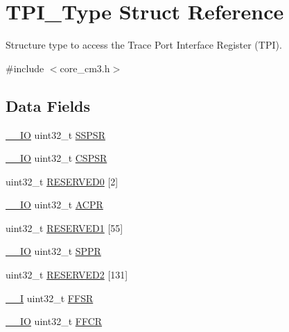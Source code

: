 \hypertarget{structTPI__Type}{\section{T\-P\-I\-\_\-\-Type Struct Reference}
\label{structTPI__Type}
}


Structure type to access the Trace Port Interface Register (T\-P\-I).  




{\ttfamily \#include $<$core\-\_\-cm3.\-h$>$}

\subsection*{Data Fields}
\begin{DoxyCompactItemize}
\item 
\hyperlink{core__cm3_8h_aec43007d9998a0a0e01faede4133d6be}{\-\_\-\-\_\-\-I\-O} uint32\-\_\-t \hyperlink{structTPI__Type_a158e9d784f6ee6398f4bdcb2e4ca0912}{S\-S\-P\-S\-R}
\item 
\hyperlink{core__cm3_8h_aec43007d9998a0a0e01faede4133d6be}{\-\_\-\-\_\-\-I\-O} uint32\-\_\-t \hyperlink{structTPI__Type_aa723ef3d38237aa2465779b3cc73a94a}{C\-S\-P\-S\-R}
\item 
uint32\-\_\-t \hyperlink{structTPI__Type_af143c5e8fc9a3b2be2878e9c1f331aa9}{R\-E\-S\-E\-R\-V\-E\-D0} \mbox{[}2\mbox{]}
\item 
\hyperlink{core__cm3_8h_aec43007d9998a0a0e01faede4133d6be}{\-\_\-\-\_\-\-I\-O} uint32\-\_\-t \hyperlink{structTPI__Type_ad75832a669eb121f6fce3c28d36b7fab}{A\-C\-P\-R}
\item 
uint32\-\_\-t \hyperlink{structTPI__Type_ac3956fe93987b725d89d3be32738da12}{R\-E\-S\-E\-R\-V\-E\-D1} \mbox{[}55\mbox{]}
\item 
\hyperlink{core__cm3_8h_aec43007d9998a0a0e01faede4133d6be}{\-\_\-\-\_\-\-I\-O} uint32\-\_\-t \hyperlink{structTPI__Type_a3eb655f2e45d7af358775025c1a50c8e}{S\-P\-P\-R}
\item 
uint32\-\_\-t \hyperlink{structTPI__Type_ac7bbb92e6231b9b38ac483f7d161a096}{R\-E\-S\-E\-R\-V\-E\-D2} \mbox{[}131\mbox{]}
\item 
\hyperlink{core__cm3_8h_af63697ed9952cc71e1225efe205f6cd3}{\-\_\-\-\_\-\-I} uint32\-\_\-t \hyperlink{structTPI__Type_ae67849b2c1016fe6ef9095827d16cddd}{F\-F\-S\-R}
\item 
\hyperlink{core__cm3_8h_aec43007d9998a0a0e01faede4133d6be}{\-\_\-\-\_\-\-I\-O} uint32\-\_\-t \hyperlink{structTPI__Type_a3eb42d69922e340037692424a69da880}{F\-F\-C\-R}

\end{DoxyCompactItemize}
